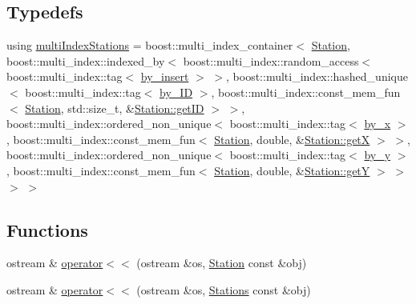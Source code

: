 \subsection*{Typedefs}
\begin{DoxyCompactItemize}
\item 
using \mbox{\hyperlink{namespaceanen_sta_a36826977aea7dbb351b814cceb511330}{multi\+Index\+Stations}} = boost\+::multi\+\_\+index\+\_\+container$<$ \mbox{\hyperlink{classanen_sta_1_1_station}{Station}}, boost\+::multi\+\_\+index\+::indexed\+\_\+by$<$ boost\+::multi\+\_\+index\+::random\+\_\+access$<$ boost\+::multi\+\_\+index\+::tag$<$ \mbox{\hyperlink{structanen_sta_1_1by__insert}{by\+\_\+insert}} $>$ $>$, boost\+::multi\+\_\+index\+::hashed\+\_\+unique$<$ boost\+::multi\+\_\+index\+::tag$<$ \mbox{\hyperlink{structanen_sta_1_1by___i_d}{by\+\_\+\+ID}} $>$, boost\+::multi\+\_\+index\+::const\+\_\+mem\+\_\+fun$<$ \mbox{\hyperlink{classanen_sta_1_1_station}{Station}}, std\+::size\+\_\+t, \&\mbox{\hyperlink{classanen_sta_1_1_station_a69be6c90e4613e4166651ff6e67cfba2}{Station\+::get\+ID}} $>$ $>$, boost\+::multi\+\_\+index\+::ordered\+\_\+non\+\_\+unique$<$ boost\+::multi\+\_\+index\+::tag$<$ \mbox{\hyperlink{structanen_sta_1_1by__x}{by\+\_\+x}} $>$, boost\+::multi\+\_\+index\+::const\+\_\+mem\+\_\+fun$<$ \mbox{\hyperlink{classanen_sta_1_1_station}{Station}}, double, \&\mbox{\hyperlink{classanen_sta_1_1_station_aa954dcd5d8f77ac9b91021b1e9c07735}{Station\+::getX}} $>$ $>$, boost\+::multi\+\_\+index\+::ordered\+\_\+non\+\_\+unique$<$ boost\+::multi\+\_\+index\+::tag$<$ \mbox{\hyperlink{structanen_sta_1_1by__y}{by\+\_\+y}} $>$, boost\+::multi\+\_\+index\+::const\+\_\+mem\+\_\+fun$<$ \mbox{\hyperlink{classanen_sta_1_1_station}{Station}}, double, \&\mbox{\hyperlink{classanen_sta_1_1_station_aadddb2db193456d14bae16dbf2b8259f}{Station\+::getY}} $>$ $>$ $>$ $>$
\end{DoxyCompactItemize}
\subsection*{Functions}
\begin{DoxyCompactItemize}
\item 
ostream \& \mbox{\hyperlink{namespaceanen_sta_abbe68650f0c5b4173991ed2220b3143f}{operator$<$$<$}} (ostream \&os, \mbox{\hyperlink{classanen_sta_1_1_station}{Station}} const \&obj)
\item 
ostream \& \mbox{\hyperlink{namespaceanen_sta_a08ae85128c31bfbd2999f821d7605eeb}{operator$<$$<$}} (ostream \&os, \mbox{\hyperlink{classanen_sta_1_1_stations}{Stations}} const \&obj)
\end{DoxyCompactItemize}


